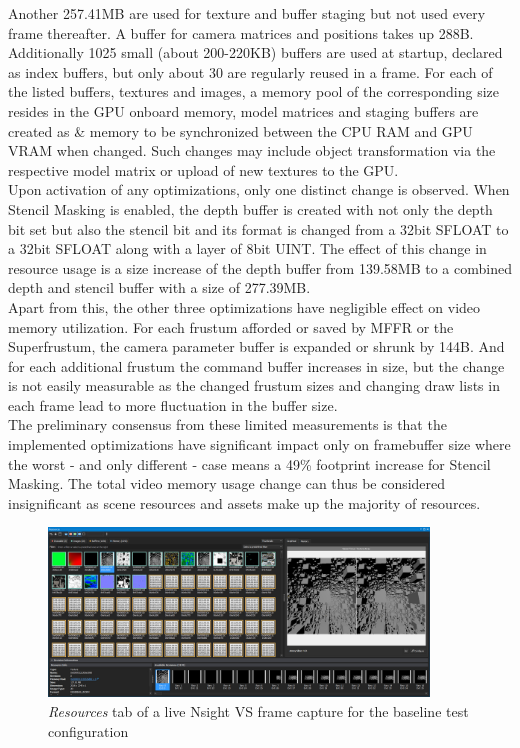 Another 257.41MB are used for texture and buffer staging but not used every frame thereafter. A buffer for camera matrices and positions takes up 288B. Additionally 1025 small (about 200-220KB) buffers are used at startup, declared as index buffers, but only about 30 are regularly reused in a frame. For each of the listed buffers, textures and images, a  memory pool of the corresponding size resides in the GPU onboard memory, model matrices and staging buffers are created as  \&  memory to be synchronized between the CPU RAM and GPU VRAM when changed. Such changes may include object transformation via the respective model matrix or upload of new textures to the GPU. \\

Upon activation of any optimizations, only one distinct change is observed. When Stencil Masking is enabled, the depth buffer is created with not only the depth bit set but also the stencil bit and its format is changed from a 32bit SFLOAT to a 32bit SFLOAT along with a layer of 8bit UINT. The effect of this change in resource usage is a size increase of the depth buffer from 139.58MB to a combined depth and stencil buffer with a size of 277.39MB. \\
Apart from this, the other three optimizations have negligible effect on video memory utilization. For each frustum afforded or saved by \gls{MFFR} or the Superfrustum, the camera parameter buffer is expanded or shrunk by 144B. And for each additional frustum the command buffer increases in size, but the change is not easily measurable as the changed frustum sizes and changing draw lists in each frame lead to more fluctuation in the buffer size. \\

The preliminary consensus from these limited measurements is that the implemented optimizations have significant impact only on framebuffer size where the worst - and only different - case means a 49\% footprint increase for Stencil Masking. The total video memory usage change can thus be considered insignificant as scene resources and assets make up the majority of resources. 

\begin{figure}[h!]
  \centering
  \includegraphics[width=0.9\textwidth]{pictures/nsight_vmem}
  \caption{\textit{Resources} tab of a live Nsight VS frame capture for the baseline test configuration} \label{fig:nsight_vmem}
\end{figure}
